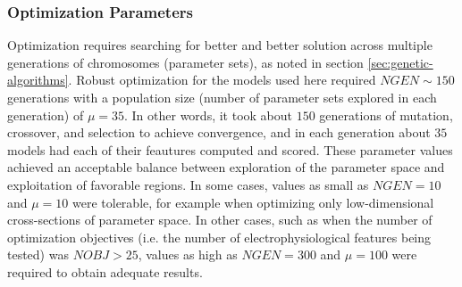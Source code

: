 \subsubsection{Optimization Parameters}
Optimization requires searching for better and better solution across multiple generations of chromosomes (parameter sets), as noted in section \ref{sec:genetic-algorithms}.
Robust optimization for the models used here required $NGEN\sim150$ generations with a population size (number of parameter sets explored in each generation) of $\mu=35$.
In other words, it took about $150$ generations of mutation, crossover, and selection to achieve convergence, and in each generation about $35$ models had each of their feautures computed and scored.
These parameter values achieved an acceptable balance between exploration of the parameter space and exploitation of favorable regions.
In some cases, values as small as $NGEN=10$ and $\mu=10$ were tolerable, for example when optimizing only low-dimensional cross-sections of parameter space.
In other cases, such as when the number of optimization objectives (i.e. the number of electrophysiological features being tested) was $NOBJ>25$, values as high as $NGEN=300$ and $\mu=100$ were required to obtain adequate results.

